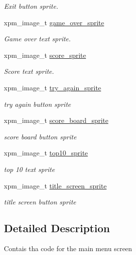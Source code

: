 \begin{DoxyCompactItemize}
\begin{DoxyCompactList}\small\item\em Exit button sprite. \end{DoxyCompactList}\item 
xpm\+\_\+image\+\_\+t \hyperlink{group__Main-Menu_ga75a1070484069c0a4b134cb82e89285f}{game\+\_\+over\+\_\+sprite}
\begin{DoxyCompactList}\small\item\em Game over text sprite. \end{DoxyCompactList}\item 
xpm\+\_\+image\+\_\+t \hyperlink{group__Main-Menu_ga9c8097218050947104e9eff7ea72ee2a}{score\+\_\+sprite}
\begin{DoxyCompactList}\small\item\em Score text sprite. \end{DoxyCompactList}\item 
xpm\+\_\+image\+\_\+t \hyperlink{group__Main-Menu_gaa41380dca9e42a7214c4383a057eb1b5}{try\+\_\+again\+\_\+sprite}
\begin{DoxyCompactList}\small\item\em try again button sprite \end{DoxyCompactList}\item 
xpm\+\_\+image\+\_\+t \hyperlink{group__Main-Menu_ga4e9f74a7ebd652ff9289c657ccbcbad2}{score\+\_\+board\+\_\+sprite}
\begin{DoxyCompactList}\small\item\em score board button sprite \end{DoxyCompactList}\item 
xpm\+\_\+image\+\_\+t \hyperlink{group__Main-Menu_ga6e4a5f1f16e719a78ad8112fba87dc55}{top10\+\_\+sprite}
\begin{DoxyCompactList}\small\item\em top 10 text sprite \end{DoxyCompactList}\item 
xpm\+\_\+image\+\_\+t \hyperlink{group__Main-Menu_ga794827f066c5e8fa039cae3a45f7b2c0}{title\+\_\+screen\+\_\+sprite}
\begin{DoxyCompactList}\small\item\em title screen button sprite \end{DoxyCompactList}\end{DoxyCompactItemize}


\subsection{Detailed Description}
Contais tha code for the main menu screen 

